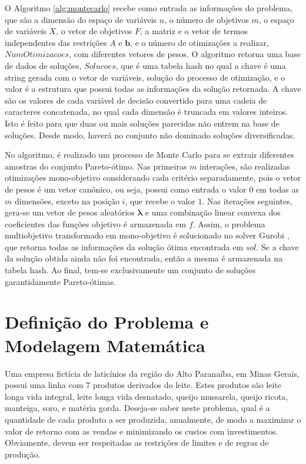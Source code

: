 \documentclass [11pt]{articleSBPO}
\begin{document}
O Algoritmo \ref{alg:montecarlo} recebe como entrada as informações do problema, que são a dimensão do espaço de variáveis $n$, o número de objetivos $m$, o espaço de variáveis $X$, o vetor de objetivos $F$, a matriz e o vetor de termos independentes das restrições $A$ e $\mathbf{b}$, e o número de otimizações a realizar, $NumOtimizacoes$, com diferentes vetores de pesos. O algoritmo retorna uma base de dados de soluções, $Solucoes$, que é uma tabela hash \cite{cormen2001introduction} no qual a chave é uma string gerada com o vetor de variáveis, solução do processo de otimização, e o valor é a estrutura que possui todas as informações da solução retornada. A chave são os valores de cada variável de decisão convertido para uma cadeia de caracteres concatenada, no qual cada dimensão é truncada em valores inteiros. Isto é feito para que duas ou mais soluções parecidas não entrem na base de soluções. Desde modo, haverá no conjunto não dominado soluções diversificadas.

No algoritmo, é realizado um processo de Monte Carlo \cite{doucet2001introduction} para se extrair diferentes amostras do conjunto Pareto-ótimo. Nas primeiras $m$ interações, são realizadas otimizações mono-objetivo considerando cada critério separadamente, pois o vetor de pesos é um vetor canônico, ou seja, possui como entrada o valor $0$ em todas as $m$ dimensões, exceto na posição $i$, que recebe o valor $1$. Nas iterações seguintes, gera-se um vetor de pesos aleatórios $\boldsymbol{\lambda}$ e uma combinação linear convexa dos coeficientes das funções objetivo é armazenada em $f$. Assim, o problema multiobjetivo transformado em mono-objetivo é solucionado no solver Gurobi \cite{gurobi}, que retorna todas as informações da solução ótima encontrada em $sol$. Se a chave da solução obtida ainda não foi encontrada, então a mesma é armazenada na tabela hash. Ao final, tem-se exclusivamente um conjunto de soluções garantidamente Pareto-ótimas.

\section{Definição do Problema e Modelagem Matemática}
\label{sec:modelo}

Uma empresa fictícia de laticínios da região do Alto Paranaíba, em Minas Gerais, possui uma linha com $ 7 $ produtos derivados do leite. Estes produtos são leite longa vida integral, leite longa vida desnatado, queijo mussarela, queijo ricota, manteiga, soro, e matéria gorda. Deseja-se saber neste problema, qual é a quantidade de cada produto a ser produzida, anualmente, de modo a maximizar o valor de retorno com as vendas e minimizando os custos com investimentos. Obviamente, devem ser respeitadas as restrições de limites e de regras de produção.
\end{document}
